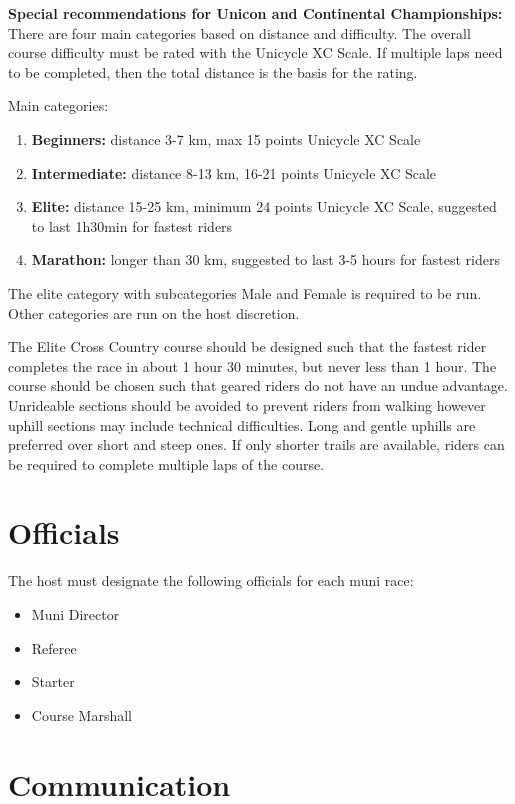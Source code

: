 \textbf{Special recommendations for Unicon and Continental Championships:}\\
There are four main categories based on distance and difficulty.
The overall course difficulty must be rated with the Unicycle XC Scale.
If multiple laps need to be completed, then the total distance is the basis for the rating.

Main categories:
\begin{enumerate}
\item \textbf{Beginners:} distance 3-7 km, max 15 points Unicycle XC Scale
\item \textbf{Intermediate:} distance 8-13 km, 16-21 points Unicycle XC Scale
\item \textbf{Elite:} distance 15-25 km, minimum 24 points Unicycle XC Scale, suggested to last 1h30min for fastest riders
\item \textbf{Marathon:} longer than 30 km, suggested to last 3-5 hours for fastest riders
\end{enumerate}

The elite category with subcategories Male and Female is required to be run.
Other categories are run on the host discretion.

The Elite Cross Country course should be designed such that the fastest rider completes the race in about 1 hour 30 minutes, but never less than 1 hour.
The course should be chosen such that geared riders do not have an undue advantage.
Unrideable sections should be avoided to prevent riders from walking however uphill sections may include technical difficulties.
Long and gentle uphills are preferred over short and steep ones.
If only shorter trails are available, riders can be required to complete multiple laps of the course.

\section{Officials}

The host must designate the following officials for each muni race:
\begin{itemize}
\item Muni Director
\item Referee
\item Starter
\item Course Marshall
\end{itemize}

\section{Communication}

